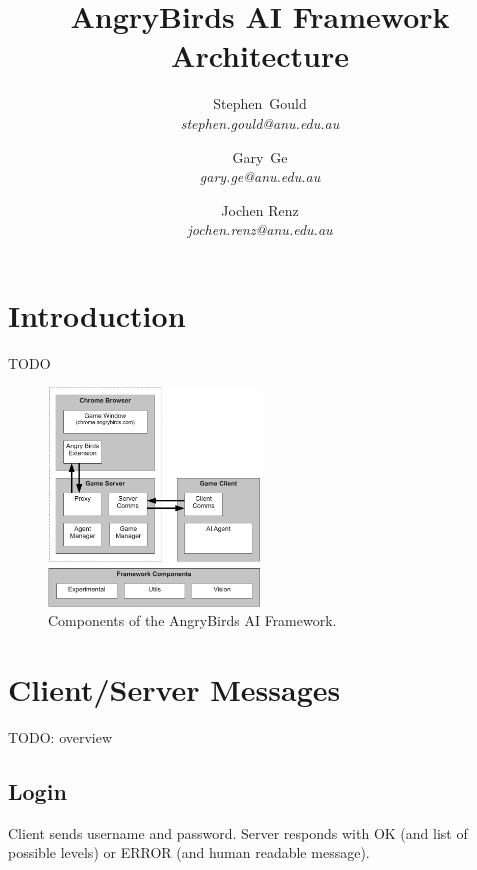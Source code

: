 \documentclass[10pt,a4paper]{article}
\numberwithin{equation}{section}
\begin{document}
\title{AngryBirds AI Framework Architecture}
\author{Stephen~Gould\\{\em stephen.gould@anu.edu.au} 
  \and Gary~Ge\\{\em gary.ge@anu.edu.au}
  \and Jochen Renz\\{\em jochen.renz@anu.edu.au}}
\maketitle


\section{Introduction}
\label{sec:introduction}

TODO

\begin{figure}[h]
  \centering
  \includegraphics[width=0.5\textwidth]{archdiagram}
  \caption{Components of the AngryBirds AI Framework.}
\end{figure}


\section{Client/Server Messages}
\label{sec:messages}

TODO: overview

\subsection{Login}

Client sends username and password. Server responds with OK (and list
of possible levels) or ERROR (and human readable message).
\end{document}

